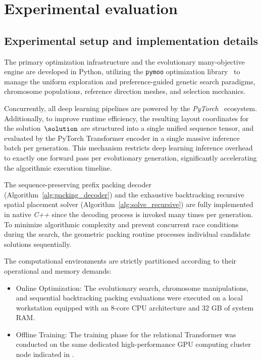 \section{Experimental evaluation}
\label{sec:results}
\subsection{Experimental setup and implementation details}
\label{sec:implementation_details}

The primary optimization infrastructure and the evolutionary many-objective engine are developed in Python, utilizing the \texttt{pymoo} optimization library~\cite{pymoo} to manage the uniform exploration and preference-guided genetic search paradigms, chromosome populations, reference direction meshes, and selection mechanics. 

Concurrently, all deep learning pipelines are powered by the \textit{PyTorch}~\cite{pytorch} ecosystem. Additionally, to improve runtime efficiency, the resulting layout coordinates for the solution~$\solution$ are  structured into a single unified sequence tensor, and evaluated by the PyTorch Transformer encoder in a single massive inference batch per generation. This mechanism restricts deep learning inference overhead to exactly one forward pass per evolutionary generation, significantly accelerating the algorithmic execution timeline.

The sequence-preserving prefix packing decoder (Algorithm~\ref{alg:packing_decoder}) and the exhaustive backtracking recursive spatial placement solver (Algorithm~\ref{alg:solve_recursive}) are fully implemented in native \textit{C++} since the decoding process is invoked many times per generation. To minimize algorithmic complexity and prevent concurrent race conditions during the search, the geometric packing routine processes individual candidate solutions sequentially. 

The computational environments are strictly partitioned according to their operational and memory demands:
\begin{itemize}
    \item Online Optimization: The evolutionary search, chromosome manipulations, and sequential backtracking packing evaluations were executed on a local workstation equipped with an 8-core CPU architecture and 32 GB of system RAM.
    
    \item Offline Training: The  training phase for the relational Transformer was conducted on the same dedicated high-performance GPU computing cluster node indicated in .
\end{itemize}



